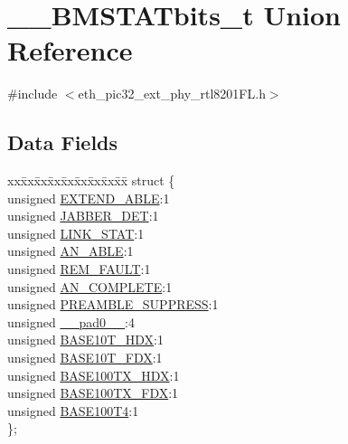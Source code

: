 \hypertarget{union_____b_m_s_t_a_tbits__t}{}\section{\+\_\+\+\_\+\+B\+M\+S\+T\+A\+Tbits\+\_\+t Union Reference}
\label{union_____b_m_s_t_a_tbits__t}


{\ttfamily \#include $<$eth\+\_\+pic32\+\_\+ext\+\_\+phy\+\_\+rtl8201\+F\+L.\+h$>$}

\subsection*{Data Fields}
\begin{DoxyCompactItemize}
\item 
\begin{tabbing}
xx\=xx\=xx\=xx\=xx\=xx\=xx\=xx\=xx\=\kill
struct \{\\
\>unsigned \hyperlink{union_____b_m_s_t_a_tbits__t_ab10a9d0fb45c718dc8e61daab8f8e451}{EXTEND\_ABLE}:1\\
\>unsigned \hyperlink{union_____b_m_s_t_a_tbits__t_a811ba1221b0907d29b86d727fdb0ba22}{JABBER\_DET}:1\\
\>unsigned \hyperlink{union_____b_m_s_t_a_tbits__t_a173180645a6b646647b053a632c6e578}{LINK\_STAT}:1\\
\>unsigned \hyperlink{union_____b_m_s_t_a_tbits__t_a4415cfc8a972fcbbbd468486c646758b}{AN\_ABLE}:1\\
\>unsigned \hyperlink{union_____b_m_s_t_a_tbits__t_acff720284bf641e0b589ea7feb2d3199}{REM\_FAULT}:1\\
\>unsigned \hyperlink{union_____b_m_s_t_a_tbits__t_a7f52210e51776891e15cedc2d8c54686}{AN\_COMPLETE}:1\\
\>unsigned \hyperlink{union_____b_m_s_t_a_tbits__t_a2a149058307fb7fbeac4de56b4b42d41}{PREAMBLE\_SUPPRESS}:1\\
\>unsigned \hyperlink{union_____b_m_s_t_a_tbits__t_adf71f3d8410c1f1dbbc96680a92c49af}{\_\_pad0\_\_}:4\\
\>unsigned \hyperlink{union_____b_m_s_t_a_tbits__t_ad90cb0b4d51e1c207ef6955ea5f42d3e}{BASE10T\_HDX}:1\\
\>unsigned \hyperlink{union_____b_m_s_t_a_tbits__t_a60f1f5eeed205a15bb647dffff3a2ee3}{BASE10T\_FDX}:1\\
\>unsigned \hyperlink{union_____b_m_s_t_a_tbits__t_acd7af0b5457a59e2264b35898c9b070f}{BASE100TX\_HDX}:1\\
\>unsigned \hyperlink{union_____b_m_s_t_a_tbits__t_a62518f2f0d4bbb7e6f305cf513b7db56}{BASE100TX\_FDX}:1\\
\>unsigned \hyperlink{union_____b_m_s_t_a_tbits__t_ae7aa36d7ff2e31c4eb9726c67e04dfea}{BASE100T4}:1\\
\}; \\


\end{tabbing}
\end{DoxyCompactItemize}
